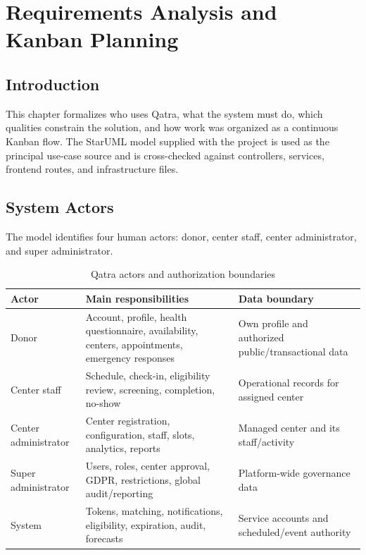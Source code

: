 \chapter{Requirements Analysis and Kanban Planning}

\section*{Introduction}
This chapter formalizes who uses Qatra, what the system must do, which qualities constrain the solution, and how work was organized as a continuous Kanban flow. The StarUML model supplied with the project is used as the principal use-case source and is cross-checked against controllers, services, frontend routes, and infrastructure files.

\section{System Actors}
The model identifies four human actors: donor, center staff, center administrator, and super administrator.

\begin{table}[H]
\centering\small
\begin{tabularx}{\textwidth}{|P{3.1cm}|Y|Y|}
\hline
{}\textbf{Actor} & \textbf{Main responsibilities} & \textbf{Data boundary}\\ \hline
Donor & Account, profile, health questionnaire, availability, centers, appointments, emergency responses & Own profile and authorized public/transactional data\\ \hline
Center staff & Schedule, check-in, eligibility review, screening, completion, no-show & Operational records for assigned center\\ \hline
Center administrator & Center registration, configuration, staff, slots, analytics, reports & Managed center and its staff/activity\\ \hline
Super administrator & Users, roles, center approval, GDPR, restrictions, global audit/reporting & Platform-wide governance data\\ \hline
System & Tokens, matching, notifications, eligibility, expiration, audit, forecasts & Service accounts and scheduled/event authority\\ \hline
\end{tabularx}
\caption{Qatra actors and authorization boundaries}
\label{tab:actors}
\end{table}

